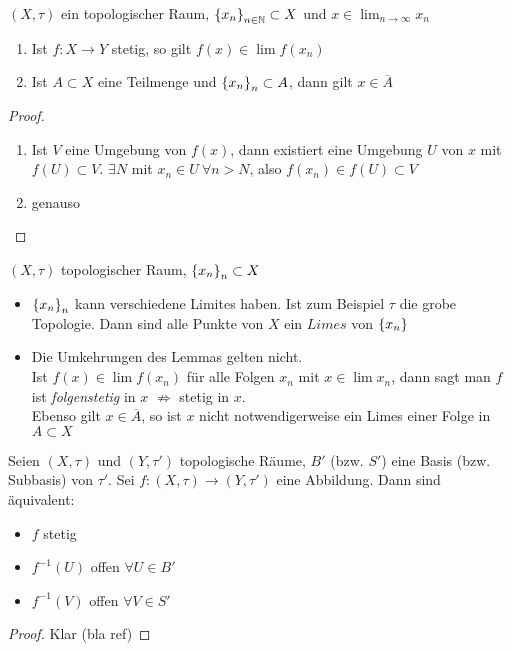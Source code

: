 \documentclass{skript}
\begin{document}
\begin{lem}
    $(X,\tau)$ ein topologischer Raum, $\mdef{x_n}_{n\in\N}\subset X$ und
    $x\in\lim_{n\to\infty}x_n$
    \begin{enumerate}
        \item Ist $f:X\to Y$ stetig, so gilt $f(x)\in \lim f(x_n)$
        \item Ist $A\subset X$ eine Teilmenge und $\mdef{x_n}_n \subset A$, dann gilt
            $x\in\overline{A}$
    \end{enumerate}
    \begin{proof}
        \begin{enumerate}
            \item Ist $V$ eine Umgebung von $f(x)$, dann existiert eine Umgebung
                $U$ von $x$ mit $f(U)\subset V$. $\exists N$ mit $x_n\in U\ \forall
                n > N$, also $f(x_n)\in f(U)\subset V$
            \item genauso
        \end{enumerate}
    \end{proof}
    \begin{bem}
        $(X,\tau)$ topologischer Raum, $\mdef{x_n}_n\subset X$
        \begin{itemize}
            \item $\mdef{x_n}_n$ kann verschiedene Limites haben. Ist zum Beispiel
                $\tau$ die grobe Topologie. Dann sind alle Punkte von $X$ ein $Limes$
                von $\mdef{x_n}$
            \item Die Umkehrungen des Lemmas gelten nicht.\\
                Ist $f(x) \in \lim f(x_n)$ für alle Folgen $x_n$ mit $x\in\lim x_n$,
                dann sagt man $f$ ist \emph{folgenstetig} in $x$ $\nRightarrow$
                stetig in $x$.\\
                Ebenso gilt $x\in\overline{A}$, so ist $x$ nicht notwendigerweise ein
                Limes einer Folge in $A\subset X$
        \end{itemize}
    \end{bem}
\end{lem}

\begin{stz}
    Seien $(X,\tau)$ und $(Y,\tau')$ topologische Räume, $B'$ (bzw. $S'$) eine Basis
    (bzw. Subbasis) von $\tau'$. Sei $f:(X,\tau)\to(Y,\tau')$ eine Abbildung.
    Dann sind äquivalent:
    \begin{itemize}
        \item $f$ stetig
        \item $f^{-1}(U)$ offen $\forall U\in B'$
        \item $f^{-1}(V)$ offen $\forall V\in S'$
    \end{itemize}
    \begin{proof}
        Klar (bla ref)
    \end{proof}
\end{stz}
\end{document}
